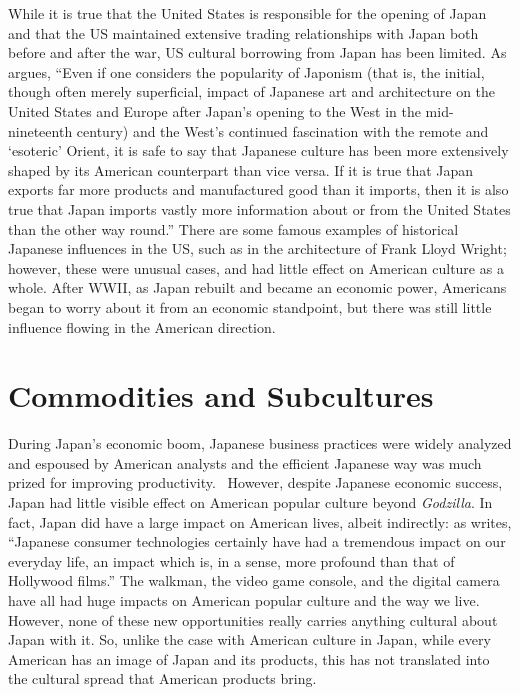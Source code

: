 \documentclass[12pt]{article}
\begin{document}
While it is true that the United States is responsible for the opening of Japan and that the US maintained extensive trading relationships with Japan both before and after the war, US cultural borrowing from Japan has been limited. As \cSurface{\citet[pg.\ 47]} argues, ``Even if one considers the popularity of Japonism (that is, the initial, though often merely superficial, impact of Japanese art and architecture on the United States and Europe after Japan's opening to the West in the mid-nineteenth century) and the West's continued fascination with the remote and `esoteric' Orient, it is safe to say that Japanese culture has been more extensively shaped by its American counterpart than vice versa.  If it is true that Japan exports far more products and manufactured good than it imports, then it is also true that Japan imports vastly more information about or from the United States than the other way round.''  There are some famous examples of historical Japanese influences in the US, such as in the architecture of Frank Lloyd Wright; however, these were unusual cases, and had little effect on American culture as a whole.  After WWII, as Japan rebuilt and became an economic power, Americans began to worry about it from an economic standpoint, but there was still little influence flowing in the American direction.

\section{Commodities and Subcultures}

During Japan's economic boom, Japanese business practices were widely analyzed and espoused by American analysts and the efficient Japanese way was much prized for improving productivity.~\cCool{\citep[pg.\ 47]}  However, despite Japanese economic success, Japan had little visible effect on American popular culture beyond \emph{Godzilla}.  In fact, Japan did have a large impact on American lives, albeit indirectly: as \cRecentering{\citet[pg.\ 24]} writes, ``Japanese consumer technologies certainly have had a tremendous impact on our everyday life, an impact which is, in a sense, more profound than that of Hollywood films.'' 
The walkman, the video game console, and the digital camera have all had huge impacts on American popular culture and the way we live.  However, none of these new opportunities really carries anything cultural about Japan with it.  So, unlike the case with American culture in Japan, while every American has an image of Japan and its products, this has not translated into the cultural spread that American products bring.
\end{document}
